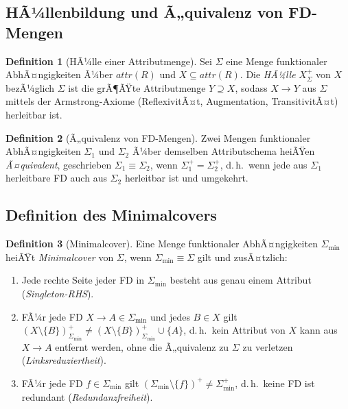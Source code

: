 ﻿\documentclass[a4paper,12pt]{report}
\theoremstyle{definition}
\newtheorem{definition}{Definition}[chapter]
\theoremstyle{remark}
\newcommand{\att}{\mathit{attr}}
\begin{document}
\subsection{HÃ¼llenbildung und Ã„quivalenz von FD-Mengen}

\begin{definition}[HÃ¼lle einer Attributmenge]
\label{def:attributhuelle}
Sei $\Sigma$ eine Menge funktionaler AbhÃ¤ngigkeiten Ã¼ber $\att(R)$ und
$X\subseteq\att(R)$. Die \emph{HÃ¼lle} $X^+_\Sigma$ von $X$ bezÃ¼glich
$\Sigma$ ist die grÃ¶ÃŸte Attributmenge $Y\supseteq X$, sodass
$X\to Y$ aus $\Sigma$ mittels der Armstrong-Axiome
\cite{Armstrong1974} (ReflexivitÃ¤t, Augmentation, TransitivitÃ¤t)
herleitbar ist.
\end{definition}

\begin{definition}[Ã„quivalenz von FD-Mengen]
\label{def:fd-aequivalent}
Zwei Mengen funktionaler AbhÃ¤ngigkeiten $\Sigma_1$ und $\Sigma_2$ Ã¼ber
demselben Attributschema heiÃŸen \emph{Ã¤quivalent}, geschrieben
$\Sigma_1 \equiv \Sigma_2$, wenn $\Sigma_1^+ = \Sigma_2^+$, d.\,h.\
wenn jede aus $\Sigma_1$ herleitbare FD auch aus $\Sigma_2$ herleitbar
ist und umgekehrt.
\end{definition}

\subsection{Definition des Minimalcovers}

\begin{definition}[Minimalcover]
\label{def:minimalcover}
Eine Menge funktionaler AbhÃ¤ngigkeiten $\Sigma_{\min}$ heiÃŸt
\emph{Minimalcover} von $\Sigma$, wenn $\Sigma_{\min}\equiv\Sigma$
gilt und zusÃ¤tzlich:
\begin{enumerate}[label=(M\arabic*)]
  \item \label{m1} Jede rechte Seite jeder FD in $\Sigma_{\min}$
    besteht aus genau einem Attribut (\emph{Singleton-RHS}).
  \item \label{m2} FÃ¼r jede FD $X\to A\in\Sigma_{\min}$ und jedes
    $B\in X$ gilt $(X\setminus\{B\})^+_{\Sigma_{\min}} \neq
    (X\setminus\{B\})^+_{\Sigma_{\min}}\cup\{A\}$, d.\,h.\ kein
    Attribut von $X$ kann aus $X\to A$ entfernt werden, ohne die
    Ã„quivalenz zu $\Sigma$ zu verletzen
    (\emph{Linksreduziertheit}).
  \item \label{m3} FÃ¼r jede FD $f\in\Sigma_{\min}$ gilt
    $(\Sigma_{\min}\setminus\{f\})^+ \neq \Sigma_{\min}^+$, d.\,h.\
    keine FD ist redundant (\emph{Redundanzfreiheit}).
\end{enumerate}
\end{definition}
\end{document}
